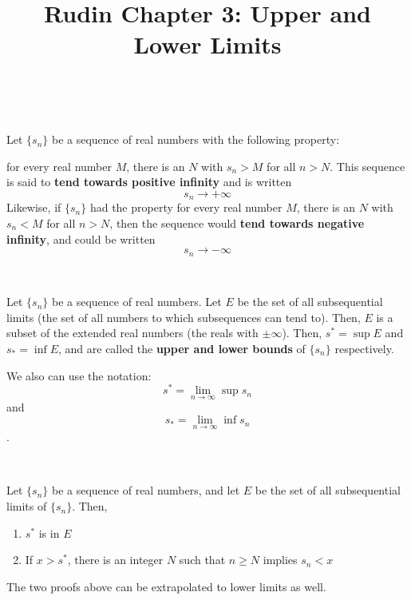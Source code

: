\documentclass{article}
\title{Rudin Chapter 3: Upper and Lower Limits}
\begin{document}
\maketitle

\begin{definition}
\

Let $\{s_n\}$ be a sequence of real numbers with the following property: 

for every real number $M$, there is an $N$ with $s_n > M$ for all $n > N$. This sequence is said to \textbf{tend towards positive infinity} and is written $$s_n \to +\infty$$Likewise, if $\{s_n\}$ had the property for every real number $M$, there is an $N$ with $s_n < M$ for all $n > N$, then the sequence would \textbf{tend towards negative infinity}, and could be written $$s_n \to -\infty$$ 
\end{definition}

\begin{definition}
\

Let $\{s_n\}$ be a sequence of real numbers. Let $E$ be the set of all subsequential limits (the set of all numbers to which subsequences can tend to). Then, $E$ is a subset of the extended real numbers (the reals with $\pm \infty$). Then, $s^* = \sup E$ and $s_* = \inf E$, and are called the \textbf{upper and lower bounds} of $\{s_n\}$ respectively. 

We also can use the notation: $$s^* = \lim_{n \to \infty} \sup s_n$$and $$s_* = \lim_{n \to \infty} \inf s_n$$.
\end{definition}

\begin{theorem}
\

Let $\{s_n\}$ be a sequence of real numbers, and let $E$ be the set of all subsequential limits of $\{s_n\}$. Then, \begin{enumerate}
    \item $s^*$ is in $E$
    \item If $x > s^*$, there is an integer $N$ such that $n \geq N$ implies $s_n < x$
\end{enumerate}

The two proofs above can be extrapolated to lower limits as well.
\end{theorem}
\end{document}
